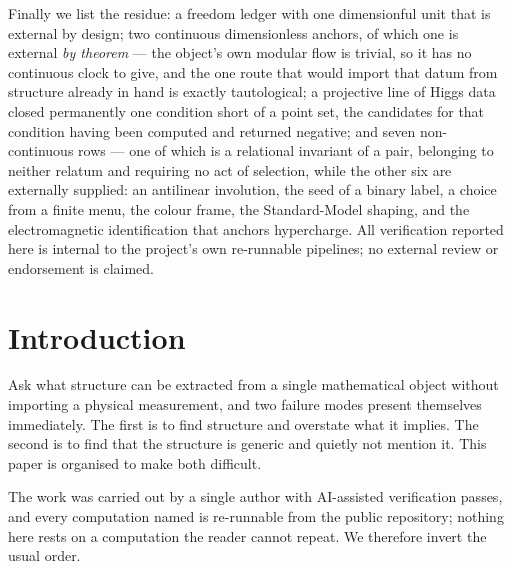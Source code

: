 \documentclass[11pt,a4paper]{article}
\theoremstyle{definition}
\theoremstyle{remark}
\begin{document}
Finally we list the residue: a freedom ledger with one dimensionful unit that is external by design; two continuous dimensionless anchors, of which one is external \emph{by theorem} --- the object's own modular flow is trivial, so it has no continuous clock to give, and the one route that would import that datum from structure already in hand is exactly tautological; a projective line of Higgs data closed permanently one condition short of a point set, the candidates for that condition having been computed and returned negative; and seven non-continuous rows --- one of which is a relational invariant of a pair, belonging to
neither relatum and requiring no act of selection, while the other six are externally supplied: an
antilinear involution, the seed of a binary label, a choice from a finite menu, the colour frame,
the Standard-Model shaping, and the electromagnetic identification that anchors hypercharge. All verification reported here is internal to the project's own re-runnable pipelines; no external review or endorsement is claimed.

\section{Introduction}

Ask what structure can be extracted from a single mathematical object without importing a physical
measurement, and two failure modes present themselves immediately. The first is to find structure and
overstate what it implies. The second is to find that the structure is generic and quietly not
mention it. This paper is organised to make both difficult.

The work was carried out by a single author with AI-assisted verification passes, and every computation named is re-runnable from the public repository; nothing here rests on a computation the reader cannot repeat. We therefore invert the usual order.
\end{document}
